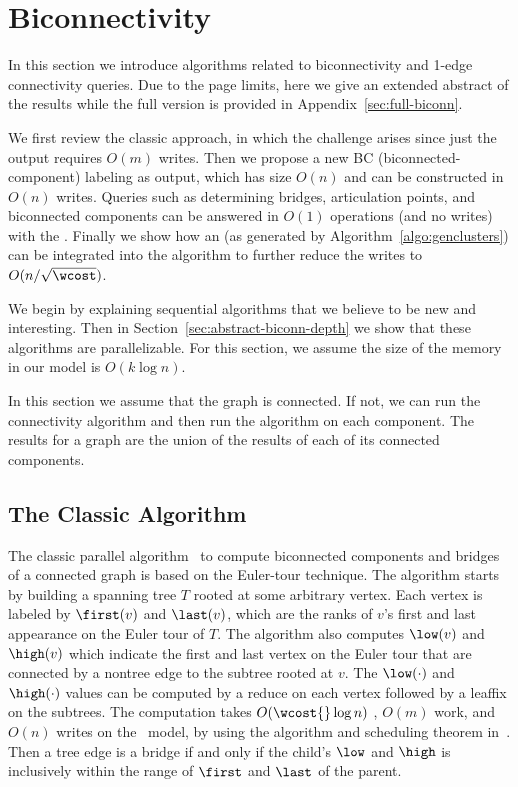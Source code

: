 \section{Biconnectivity}

In this section we introduce algorithms related to biconnectivity
and 1-edge connectivity queries.
Due to the page limits, here we give an extended abstract of the results while the full version is provided in Appendix~\ref{sec:full-biconn}.

We first review the classic approach, in which the challenge arises since just the output requires $O(m)$ writes.
Then we propose a new BC (biconnected-component) labeling as output, which has size $O(n)$ and can be constructed in $O(n)$ writes.
Queries such as determining bridges,
articulation points, and biconnected components can be answered in
$O(1)$ operations (and no writes) with the \imprep{}.
Finally we show how an \implicit{}
(as generated by Algorithm~\ref{algo:genclusters}) can be integrated into
the algorithm to further reduce the writes to $O(n/\sqrt{\wcost})$.

We begin by explaining sequential algorithms that we believe to be new and interesting.
Then in Section~\ref{sec:abstract-biconn-depth} we show that these algorithms are parallelizable.
For this section, we assume the size of the \local{}
memory in our model is $O(k\log n)$.

In this section we assume that the graph is connected.
If not, we can run the connectivity algorithm and
then run the algorithm on each component.  The results for a graph
are the union of the results of each of its connected components.

\subsection{The Classic Algorithm}

The classic parallel algorithm~\cite{tarjan1985efficient} to compute
biconnected components and bridges of a connected graph is based on
the Euler-tour technique.  The algorithm starts by building a
spanning tree $T$ rooted at some arbitrary vertex. Each vertex is
labeled by $\first(v)$
and $\last(v)$, which are the ranks of $v$'s first and last appearance
on the Euler tour of $T$.
The algorithm also computes $\low(v)$ and $\high(v)$ which indicate the first and last vertex
on the Euler tour that are connected by a nontree edge to the subtree rooted
at $v$.  The $\low(\cdot)$ and $\high(\cdot)$ values
can be computed by a reduce on each vertex followed by a leaffix on
the subtrees.  The computation takes $O(\wcost{}\log n)$ \depth,
$O(m)$ work, and $O(n)$ writes on the \ourmodel\ model, by using the algorithm
and scheduling theorem in~\cite{BBFGGMS16}.  Then a tree edge is a
bridge if and only if the child's $\low$ and $\high$ is inclusively
within the range of $\first$ and $\last$ of the parent.

